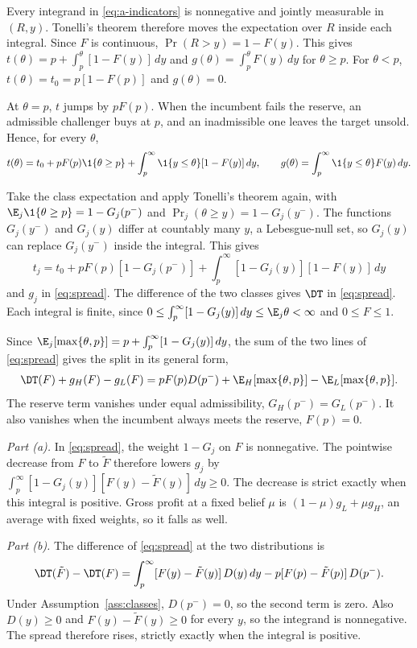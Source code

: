 Every integrand in \eqref{eq:a-indicators} is nonnegative and jointly measurable in \((R,y)\). Tonelli's theorem
therefore moves the expectation over \(R\) inside each integral. Since \(F\) is continuous,
\(\Pr(R>y)=1-F(y)\). This gives \(t(\theta)=p+\int_p^\theta[1-F(y)]\,dy\) and \(g(\theta)=\int_p^\theta
F(y)\,dy\) for \(\theta\ge p\). For \(\theta<p\), \(t(\theta)=t_0=p[1-F(p)]\) and \(g(\theta)=0\).

At \(\theta=p\), \(t\) jumps by \(pF(p)\). When the incumbent fails the reserve, an admissible challenger buys at
\(p\), and an inadmissible one leaves the target unsold. Hence, for every \(\theta\),
\[
t(\theta)=t_0+pF(p)\1\{\theta\ge p\}+\int_p^\infty\1\{y\le\theta\}[1-F(y)]\,dy,\qquad
g(\theta)=\int_p^\infty\1\{y\le\theta\}F(y)\,dy.
\]

Take the class expectation and apply Tonelli's theorem again, with \(\E_j\1\{\theta\ge p\}=1-G_j(p^-)\) and
\(\Pr_j(\theta\ge y)=1-G_j(y^-)\). The functions \(G_j(y^-)\) and \(G_j(y)\) differ at countably many \(y\), a
Lebesgue-null set, so \(G_j(y)\) can replace \(G_j(y^-)\) inside the integral. This gives
\[
t_j=t_0+pF(p)[1-G_j(p^-)]+\int_p^\infty[1-G_j(y)][1-F(y)]\,dy
\]
and \(g_j\) in \eqref{eq:spread}. The difference of the two classes gives \(\DT\) in \eqref{eq:spread}. Each
integral is finite, since \(0\le\int_p^\infty[1-G_j(y)]\,dy\le\E_j\theta<\infty\) and \(0\le F\le1\).

Since \(\E_j[\max\{\theta,p\}]=p+\int_p^\infty[1-G_j(y)]\,dy\), the sum of the two lines of \eqref{eq:spread}
gives the split in its general form,
\[
\DT(F)+g_H(F)-g_L(F)=pF(p)D(p^-)+\E_H[\max\{\theta,p\}]-\E_L[\max\{\theta,p\}].
\]
The reserve term vanishes under equal admissibility, \(G_H(p^-)=G_L(p^-)\). It also vanishes when the incumbent
always meets the reserve, \(F(p)=0\).

\emph{Part (a).} In \eqref{eq:spread}, the weight \(1-G_j\) on \(F\) is nonnegative. The pointwise decrease
from \(F\) to \(\tilde F\) therefore lowers \(g_j\) by \(\int_p^\infty[1-G_j(y)][F(y)-\tilde F(y)]\,dy\ge0\).
The decrease is strict exactly when this integral is positive. Gross profit at a fixed belief \(\mu\) is
\((1-\mu)g_L+\mu g_H\), an average with fixed weights, so it falls as well.

\emph{Part (b).} The difference of \eqref{eq:spread} at the two distributions is
\[
\DT(\tilde F)-\DT(F)=\int_p^\infty[F(y)-\tilde F(y)]\,D(y)\,dy-p[F(p)-\tilde F(p)]\,D(p^-).
\]
Under Assumption~\ref{ass:classes}, \(D(p^-)=0\), so the second term is zero. Also \(D(y)\ge0\) and
\(F(y)-\tilde F(y)\ge0\) for every \(y\), so the integrand is nonnegative. The spread therefore rises, strictly
exactly when the integral is positive.

